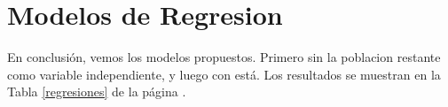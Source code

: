 \section{Modelos de Regresion}\label{regresion}


En conclusión, vemos los modelos propuestos. Primero sin la poblacion restante como variable independiente, y luego con está. Los resultados se muestran en la Tabla \ref{regresiones} de la página \pageref{regresiones}.

